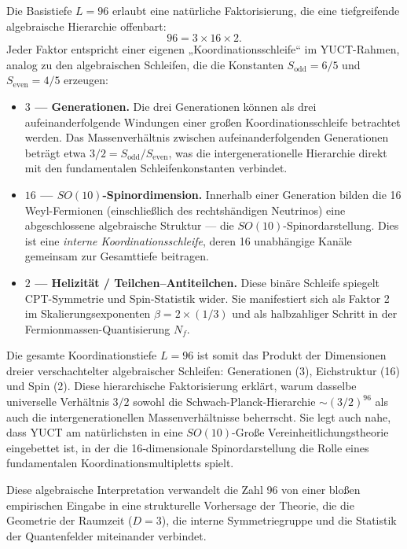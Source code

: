 \documentclass[11pt,a4paper]{article}
\newcommand{\Sodd}{S_{\mathrm{odd}}}
\newcommand{\Seven}{S_{\mathrm{even}}}
\begin{document}
	Die Basistiefe \(L = 96\) erlaubt eine natürliche Faktorisierung, die eine tiefgreifende algebraische Hierarchie offenbart:
	\[
	96 = 3 \times 16 \times 2.
	\]
	Jeder Faktor entspricht einer eigenen „Koordinationsschleife“ im YUCT-Rahmen, analog zu den algebraischen Schleifen, die die Konstanten \(\Sodd = 6/5\) und \(\Seven = 4/5\) erzeugen:
	
	\begin{itemize}
		\item \textbf{\(3\) — Generationen.} Die drei Generationen können als drei aufeinanderfolgende Windungen einer großen Koordinationsschleife betrachtet werden. Das Massenverhältnis zwischen aufeinanderfolgenden Generationen beträgt etwa \(3/2 = \Sodd/\Seven\), was die intergenerationelle Hierarchie direkt mit den fundamentalen Schleifenkonstanten verbindet.
		\item \textbf{\(16\) — \(SO(10)\)-Spinordimension.} Innerhalb einer Generation bilden die 16 Weyl-Fermionen (einschließlich des rechtshändigen Neutrinos) eine abgeschlossene algebraische Struktur — die \(SO(10)\)-Spinordarstellung. Dies ist eine \emph{interne Koordinationsschleife}, deren 16 unabhängige Kanäle gemeinsam zur Gesamttiefe beitragen.
		\item \textbf{\(2\) — Helizität / Teilchen–Antiteilchen.} Diese binäre Schleife spiegelt CPT-Symmetrie und Spin-Statistik wider. Sie manifestiert sich als Faktor 2 im Skalierungsexponenten \(\beta = 2 \times (1/3)\) und als halbzahliger Schritt in der Fermionmassen-Quantisierung \(N_f\).
	\end{itemize}
	
	Die gesamte Koordinationstiefe \(L = 96\) ist somit das Produkt der Dimensionen dreier verschachtelter algebraischer Schleifen: Generationen (3), Eichstruktur (16) und Spin (2). Diese hierarchische Faktorisierung erklärt, warum dasselbe universelle Verhältnis \(3/2\) sowohl die Schwach-Planck-Hierarchie \(\sim (3/2)^{96}\) als auch die intergenerationellen Massenverhältnisse beherrscht. Sie legt auch nahe, dass YUCT am natürlichsten in eine \(SO(10)\)-Große Vereinheitlichungstheorie eingebettet ist, in der die 16‑dimensionale Spinordarstellung die Rolle eines fundamentalen Koordinationsmultipletts spielt.
	
	Diese algebraische Interpretation verwandelt die Zahl 96 von einer bloßen empirischen Eingabe in eine strukturelle Vorhersage der Theorie, die die Geometrie der Raumzeit (\(D=3\)), die interne Symmetriegruppe und die Statistik der Quantenfelder miteinander verbindet.
	
\end{document}
